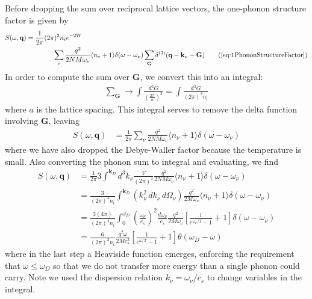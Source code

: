 \documentclass{article}
\begin{document}
Before dropping the sum over reciprocal lattice vectors, the one-phonon structure factor is given by
\begin{align}
S(\omega, \textbf{q}) &= \frac{1}{2 \pi} (2 \pi)^3 n_i e^{-2 W}  \nonumber\\
&\qquad\qquad  \sum_\nu\frac{q^2}{2 NM \omega_\nu} \langle n_\nu + 1 \rangle \delta(\omega - \omega_\nu) \sum_\textbf{G} \delta^{(3)}(\textbf{q} - \textbf{k}_\nu - \textbf{G})
\tag{\ref{eq:1PhononStructureFactor}}
\end{align}
In order to compute the sum over $\textbf{G}$, we convert this into an integral:
\begin{align}
\sum_\textbf{G} \to \int \frac{d^3 G}{\left( \frac{2 \pi}{a} \right)^3} = \int \frac{d^3 G}{(2 \pi)^3 n_i}
\end{align}
where $a$ is the lattice spacing. This integral serves to remove the delta function involving $\textbf{G}$, leaving
\begin{align}
S(\omega, \textbf{q}) &= \frac{1}{2 \pi}  \sum_\nu\frac{q^2}{2 NM \omega_\nu} \langle n_\nu + 1 \rangle \delta(\omega - \omega_\nu)
\end{align}
where we have also dropped the Debye-Waller factor because the temperature is small. Also converting the phonon sum to integral and evaluating, we find
\begin{align}
   S(\omega, \textbf{q}) &= \frac{1}{2 \pi}  3 \int^{\textbf{k}_D} d^3 k_\nu \frac{V}{(2 \pi)^3} \frac{q^2}{2 NM \omega_\nu} \langle n_\nu + 1 \rangle \delta(\omega - \omega_\nu) \nonumber\\
   &= \frac{3}{(2 \pi)^4 n_i}  \int^{\textbf{k}_D} (k_\nu^2\, dk_\nu \, d \Omega_\nu) \frac{q^2}{2 M \omega_\nu} \langle n_\nu + 1 \rangle \delta(\omega - \omega_\nu) \nonumber\\
   &= \frac{3(4 \pi)}{(2 \pi)^4 n_i}  \int_0^{\omega_D} \left( \frac{\omega_\nu}{c_s} \right)^2 \frac{d \omega_\nu}{c_s} \frac{q^2}{2 M \omega_\nu} \left[ \frac{1}{e^{\omega_\nu/T} - 1} + 1 \right] \delta(\omega - \omega_\nu) \nonumber\\
   &= \frac{6}{(2 \pi)^3 n_i} \frac{q^2\omega}{2 M c_s^3} \left[ \frac{1}{e^{\omega/T} - 1} + 1 \right] \theta(\omega_D - \omega)
   \label{eq:UmklappStructureFactor}
\end{align}
where in the last step a Heaviside function emerges, enforcing the requirement that $\omega \leq \omega_D$ so that we do not transfer more energy than a single phonon could carry. Note we used the dispersion relation $k_\nu = \omega_\nu / c_s$ to change variables in the integral.
\end{document}
